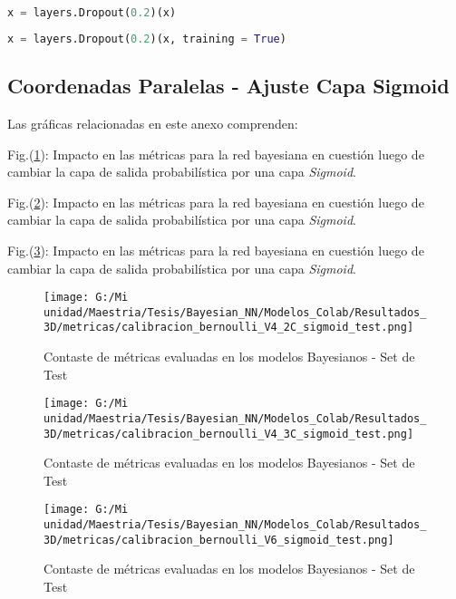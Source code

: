 \documentclass[10pt, oneside, a4paper]{article}
\begin{document}
	
	\begin{lstlisting}[language=Python, caption={Modificamos la capa dropout:}]
		x = layers.Dropout(0.2)(x)
	\end{lstlisting}
	
	\begin{lstlisting}[language=Python, caption={Capa modificada:}]
		x = layers.Dropout(0.2)(x, training = True)
	\end{lstlisting}	

	\subsection{Coordenadas Paralelas - Ajuste Capa Sigmoid} \label{coordenadas_paralelas}

	Las gráficas relacionadas en este anexo comprenden:
	
	Fig.(\ref{fig:calibracion_bernoulli_V4_2C_sigmoid_test}): Impacto en las métricas para la red bayesiana en cuestión luego de cambiar la capa de salida probabilística por una capa \textsl{Sigmoid}.
	
	Fig.(\ref{fig:calibracion_bernoulli_V4_3C_sigmoid_test}): Impacto en las métricas para la red bayesiana en cuestión luego de cambiar la capa de salida probabilística por una capa \textsl{Sigmoid}.
	
	Fig.(\ref{fig:calibracion_bernoulli_V6_sigmoid_test}): Impacto en las métricas para la red bayesiana en cuestión luego de cambiar la capa de salida probabilística por una capa \textsl{Sigmoid}.

		\begin{figure}[H]
		\centering
		\texttt{[image: G:/Mi unidad/Maestria/Tesis/Bayesian\_NN/Modelos\_Colab/Resultados\_3D/metricas/calibracion\_bernoulli\_V4\_2C\_sigmoid\_test.png]}
		\caption{Contaste de métricas evaluadas en los modelos Bayesianos - Set de Test}
		\label{fig:calibracion_bernoulli_V4_2C_sigmoid_test}
		\end{figure}
	
		\begin{figure}[H]
		\centering
		\texttt{[image: G:/Mi unidad/Maestria/Tesis/Bayesian\_NN/Modelos\_Colab/Resultados\_3D/metricas/calibracion\_bernoulli\_V4\_3C\_sigmoid\_test.png]}
		\caption{Contaste de métricas evaluadas en los modelos Bayesianos - Set de Test}
		\label{fig:calibracion_bernoulli_V4_3C_sigmoid_test}
		\end{figure}
	
		\begin{figure}[H]
		\centering
		\texttt{[image: G:/Mi unidad/Maestria/Tesis/Bayesian\_NN/Modelos\_Colab/Resultados\_3D/metricas/calibracion\_bernoulli\_V6\_sigmoid\_test.png]}
		\caption{Contaste de métricas evaluadas en los modelos Bayesianos - Set de Test}
		\label{fig:calibracion_bernoulli_V6_sigmoid_test}
		\end{figure}	
\end{document}
